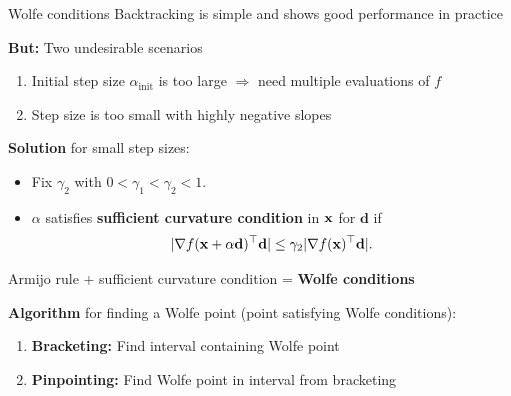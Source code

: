 \documentclass[11pt,compress,t,notes=noshow, xcolor=table]{beamer}
\begin{document}
	\begin{vbframe}{Wolfe conditions}
        Backtracking is simple and shows good performance in practice

        \medskip

        \textbf{But:} Two undesirable scenarios
        \begin{enumerate}
            \item Initial step size $\alpha_{\text{init}}$ is too large $\Rightarrow$ need multiple evaluations of $f$
            \item Step size is too small with highly negative slopes
        \end{enumerate}

        \medskip

        \textbf{Solution} for small step sizes:
        \begin{itemize}
            \item Fix $\gamma_2$ with $0 < \gamma_1 < \gamma_2 < 1$.
            \item $\alpha$ satisfies \textbf{sufficient curvature condition} in $\mathbf{x}$ for $\mathbf{d}$ if
                \begin{equation*}
		              | \nabla f(\mathbf{x} + \alpha \mathbf{d})^\top \mathbf{d} | \leq \gamma_2 | \nabla f(\mathbf{x})^\top \mathbf{d} |.
                \end{equation*}
        \end{itemize}
        
        \begin{center}
            \begin{framed}
                Armijo rule + sufficient curvature condition = \textbf{Wolfe conditions}
            \end{framed}
        \end{center}

        \framebreak

        \textbf{Algorithm} for finding a Wolfe point (point satisfying Wolfe conditions):
        \begin{enumerate}
            \item \textbf{Bracketing:} Find interval containing Wolfe point
            \item \textbf{Pinpointing:} Find Wolfe point in interval from bracketing
        \end{enumerate}


\end{vbframe}
\end{document}

